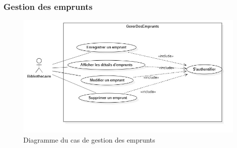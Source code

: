 \subsubsection{Gestion des emprunts} 
\begin{figure}[h]
        \centering
        \includegraphics[width=1\textwidth]{gestionDesEmpruntsUseCase}
        \caption{Diagramme du cas de gestion des emprunts}
        \label{image-gestionDesEmpruntsUseCase}
        \end{figure}
